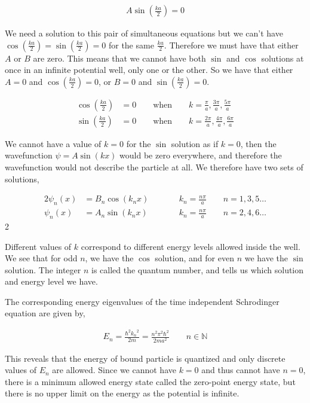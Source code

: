 \documentclass[11pt]{amsart}
\begin{document}
\begin{align*}
  A \sin{\left(\frac{ka}{2}\right)} = 0
\end{align*}

We need a solution to this pair of simultaneous equations but we can't have $\cos{\left(\frac{ka}{2}\right)} = \sin{\left(\frac{ka}{2}\right)} = 0$ for the same $\frac{ka}{2}$. Therefore we must have that either $A$ or $B$ are zero. This means that we cannot have both $\sin$ and $\cos$ solutions at once in an infinite potential well, only one or the other. So we have that either $A = 0$ and $\cos{\left(\frac{ka}{2}\right)} = 0$, or $B = 0$ and $\sin{\left(\frac{ka}{2}\right)} = 0$.

\begin{align*}
  \cos{\left(\frac{ka}{2}\right)} &= 0 \qquad \text{when} \qquad k = \frac{\pi}{a}, \frac{3\pi}{a}, \frac{5\pi}{a} \\
  \sin{\left(\frac{ka}{2}\right)} &= 0 \qquad \text{when} \qquad k = \frac{2\pi}{a}, \frac{4\pi}{a}, \frac{6\pi}{a}
\end{align*}

We cannot have a value of $k = 0$ for the $\sin$ solution as if $k = 0$, then the wavefunction $\psi = A\sin{\left(kx\right)}$ would be zero everywhere, and therefore the wavefunction would not describe the particle at all. We therefore have two sets of solutions,

\begin{alignat*}{2}
  \psi_n(x) &= B_n \cos(k_n x) \qquad &&k_n = \frac{n\pi}{a} \qquad n = 1, 3, 5\dots \\
  \psi_n(x) &= A_n \sin(k_n x) \qquad &&k_n = \frac{n\pi}{a} \qquad n = 2, 4, 6\dots
\end{alignat*}{2}

Different values of $k$ correspond to different energy levels allowed inside the well. We see that for odd $n$, we have the $\cos$ solution, and for even $n$ we have the $\sin$ solution. The integer $n$ is called the quantum number, and tells us which solution and energy level we have.

The corresponding energy eigenvalues of the time independent Schrodinger equation are given by,

\begin{align*}
  E_n = \frac{\hbar^2 {k_n}^2}{2m} = \frac{n^2 \pi^2 \hbar^2}{2ma^2} \qquad n \in \mathbb{N}
\end{align*}

This reveals that the energy of bound particle is quantized and only discrete values of $E_n$ are allowed. Since we cannot have $k = 0$ and thus cannot have $n = 0$, there is a minimum allowed energy state called the zero-point energy state, but there is no upper limit on the energy as the potential is infinite.
\end{document}
